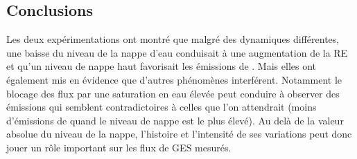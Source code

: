 \subsection{Conclusions}

Les deux expérimentations ont montré que malgré des dynamiques différentes, une baisse du niveau de la nappe d'eau conduisait à une augmentation de la RE et qu'un niveau de nappe haut favorisait les émissions de \chh.
Mais elles ont également mis en évidence que d'autres phénomènes interférent.
Notamment le blocage des flux par une saturation en eau élevée peut conduire à observer des émissions qui semblent contradictoires à celles que l'on attendrait (moins d'émissions de \chh quand le niveau de nappe est le plus élevé).
Au delà de la valeur absolue du niveau de la nappe, l'histoire et l'intensité de ses variations peut donc jouer un rôle important sur les flux de GES mesurés.